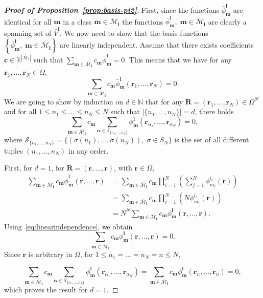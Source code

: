 \documentclass{article}
\newcommand{\bphi}[2]{\bar\phi^{#1}_{#2}}
\newcommand{\bV}{{\bar V}}
\newcommand{\card}[1]{|{#1}|}
\numberwithin{equation}{section}
\def\N{\mathbb{N}}
\def\K{\mathbb{K}}
\def\bc{{\bm c}}
\def\br{{\bm r}}
\def\bl{{\bm l}}
\def\bbm{{\bm m}}
\def\bR{{\bm R}}
\def\calM{\mathcal{M}}
\def\calS{\mathcal{S}}
\def\oMl{\overline{\calM}_\bl}
\def\Nat{{N}}
\begin{document}
\begin{proof}[\bf{Proof of Proposition~\ref{prop:basis-pi2}}]
First, since the functions $\bphi{\bl}{\bbm}$ are identical for all $\bbm$ in a class $\overline{\bbm} \in\oMl$
    the functions $\bphi{\bl}{\bbm},\;\bbm\in\oMl$ are clearly a spanning set of $\bV^{\bl}$.
We now need to show that the basis functions $\left\{ \bphi{\bl}{\bbm},\;\bbm\in\oMl\right\}$ are linearly independent.
Assume that
there exists coefficients $\bc \in \K^{|\oMl|}$ such that 
$\displaystyle\sum_{\bbm \in\oMl}c_\bbm\bphi{\bl}{\bbm}=0$. This means that we have for any $\br_1,\ldots,\br_N\in \Omega$,
\begin{equation}
    \label{eq:linearindependence}
    \displaystyle\sum_{\bbm \in\oMl}c_\bbm\bphi{\bl}{\bbm}(\br_1,\ldots,\br_\Nat) = 0.
\end{equation}
We are going to show by induction on $d \in \N$ that for any $\bR = (\br_1,\ldots,\br_\Nat)\in\Omega^\Nat$ and for all $1\le n_1\le\ldots\le n_\Nat\le \Nat$ such that $\card{\{n_1,\ldots,n_\Nat \}  }=d$, there holds
\begin{equation}
        \displaystyle\sum_{\bbm \in\oMl}c_\bbm \sum_{\bm{\alpha}\in \calS_{\{n_1,\ldots,n_\Nat\}}}\phi^\bl_\bbm
    (\br_{\alpha_1}, \ldots, \br_{\alpha_\Nat})=0,
    \label{eq:induction_step}
\end{equation}
where $\calS_{\{n_1,\ldots,n_\Nat\}}=\{({\sigma(n_1)},\ldots,{\sigma(n_\Nat)}),\;\sigma\in S_\Nat\}$ is the set of all different tuples $(n_1,\ldots,n_\Nat)$ in any order.

First, for $d=1$, 
for 
$\bR=(\br,\dots,\br)$, with $\br\in\Omega$,
\begin{align*}
    \displaystyle\sum_{\bbm \in\oMl}c_\bbm\bphi{\bl}{\bbm}(\br,\ldots,\br)
    &=\displaystyle\sum_{\bbm \in\oMl}c_\bbm\prod_{i=1}^\Nat\left(\sum_{j=1}^{\Nat}\phi^{l_i}_{m_i}\left(\br\right)\right)\\
    &=\displaystyle\sum_{\bbm \in\oMl}c_\bbm\prod_{i=1}^\Nat\left(\Nat\phi^{l_i}_{m_i}\left(\br\right)\right)\\
    &=\Nat^\Nat\displaystyle\sum_{\bbm \in\oMl}c_\bbm \phi^\bl_\bbm(\br,\ldots,\br).
\end{align*}
Using~\eqref{eq:linearindependence}, we obtain
\[
    \sum_{\bbm \in\oMl}c_\bbm \phi^\bl_\bbm(\br,\ldots,\br) = 0.
\]
Since $\br$ is arbitrary in $\Omega$, for $1\le n_1=\ldots=n_\Nat=n\le\Nat$,

\[
    \displaystyle\sum_{\bbm \in\oMl}c_\bbm \sum_{\bm{\alpha}\in \calS_{\{n_1,\ldots,n_\Nat\}}}\phi^\bl_\bbm
    (\br_{\alpha_1}, \ldots, \br_{\alpha_\Nat})=\displaystyle\sum_{\bbm \in\oMl}c_\bbm \phi^\bl_\bbm(\br_{n},\ldots,\br_{n})
    =0,
\]
which proves the result for $d=1$.


\end{proof}
\end{document}
